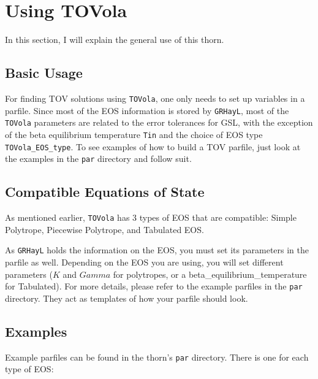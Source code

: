 \section{Using TOVola}

In this section, I will explain the general use of this thorn. 

\subsection{Basic Usage}

For finding TOV solutions using {\tt TOVola}, one only needs to set up variables in a parfile. Since most of the EOS information is stored by {\tt GRHayL}, most of the {\tt TOVola} parameters are related to the error tolerances for GSL, with the exception of the beta equilibrium temperature {\tt Tin} and the choice of EOS type {\tt TOVola\_EOS\_type}. To see examples of how to build a TOV parfile, just look at the examples in the {\tt par} directory and follow suit.

\subsection{Compatible Equations of State}

As mentioned earlier, {\tt TOVola} has 3 types of EOS that are compatible: Simple Polytrope, Piecewise Polytrope, and Tabulated EOS.

As {\tt GRHayL}\cite{GRHayL} holds the information on the EOS, you must set its parameters in the parfile as well. Depending on the EOS you are using, you will set different parameters ($K$ and $Gamma$ for polytropes, or a beta_equilibrium_temperature for Tabulated). For more details, please refer to the example parfiles in the {\tt par} directory. They act as templates of how your parfile should look.

\subsection{Examples}

Example parfiles can be found in the thorn's {\tt par} directory. There is one for each type of EOS:

